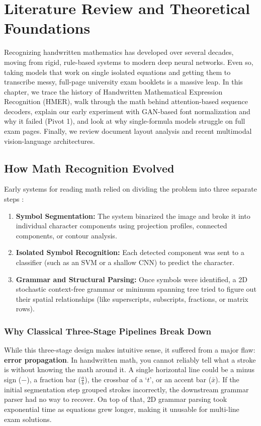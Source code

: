 \chapter{Literature Review and Theoretical Foundations}
\label{ch:literature_review}

Recognizing handwritten mathematics has developed over several decades, moving from rigid, rule-based systems to modern deep neural networks. Even so, taking models that work on single isolated equations and getting them to transcribe messy, full-page university exam booklets is a massive leap. In this chapter, we trace the history of Handwritten Mathematical Expression Recognition (HMER), walk through the math behind attention-based sequence decoders, explain our early experiment with GAN-based font normalization and why it failed (Pivot 1), and look at why single-formula models struggle on full exam pages. Finally, we review document layout analysis and recent multimodal vision-language architectures.

\section{How Math Recognition Evolved}
\label{sec:chronological_evolution}

Early systems for reading math relied on dividing the problem into three separate steps \cite{smith2007overview}:
\begin{enumerate}
    \item \textbf{Symbol Segmentation:} The system binarized the image and broke it into individual character components using projection profiles, connected components, or contour analysis.
    \item \textbf{Isolated Symbol Recognition:} Each detected component was sent to a classifier (such as an SVM or a shallow CNN) to predict the character.
    \item \textbf{Grammar and Structural Parsing:} Once symbols were identified, a 2D stochastic context-free grammar or minimum spanning tree tried to figure out their spatial relationships (like superscripts, subscripts, fractions, or matrix rows).
\end{enumerate}

\subsection{Why Classical Three-Stage Pipelines Break Down}
While this three-stage design makes intuitive sense, it suffered from a major flaw: \textbf{error propagation}. In handwritten math, you cannot reliably tell what a stroke is without knowing the math around it. A single horizontal line could be a minus sign ($-$), a fraction bar ($\frac{a}{b}$), the crossbar of a `$t$', or an accent bar ($\bar{x}$). If the initial segmentation step grouped strokes incorrectly, the downstream grammar parser had no way to recover. On top of that, 2D grammar parsing took exponential time as equations grew longer, making it unusable for multi-line exam solutions.

